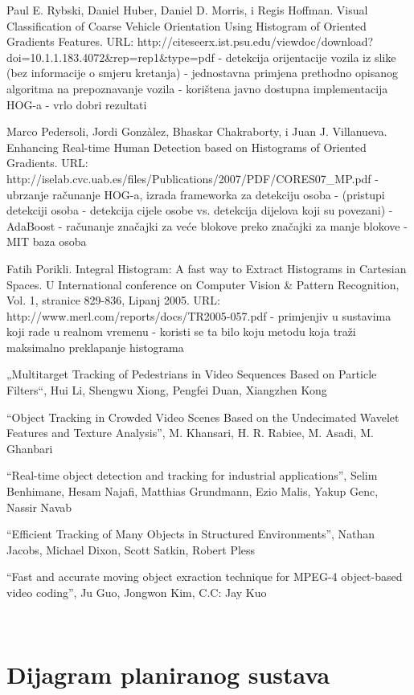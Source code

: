 \documentclass[times, utf8, seminar, numeric]{fer}
\begin{document}
Paul E. Rybski, Daniel Huber, Daniel D. Morris, i Regis Hoffman. Visual Classiﬁcation of Coarse Vehicle Orientation Using Histogram of Oriented Gradients Features. URL: http://citeseerx.ist.psu.edu/viewdoc/download?doi=10.1.1.183.4072&rep=rep1&type=pdf
- detekcija orijentacije vozila iz slike (bez informacije o smjeru kretanja)
- jednostavna primjena prethodno opisanog algoritma na prepoznavanje vozila
- korištena javno dostupna implementacija HOG-a
- vrlo dobri rezultati


Marco Pedersoli, Jordi Gonzàlez, Bhaskar Chakraborty, i Juan J. Villanueva. Enhancing Real-time Human Detection based on Histograms of Oriented Gradients. URL: http://iselab.cvc.uab.es/files/Publications/2007/PDF/CORES07_MP.pdf
- ubrzanje računanje HOG-a, izrada frameworka za detekciju osoba
- (pristupi detekciji osoba - detekcija cijele osobe vs. detekcija dijelova koji su povezani)
- AdaBoost
- računanje značajki za veće blokove preko značajki za manje blokove
- MIT baza osoba


Fatih Porikli. Integral Histogram: A fast way to Extract Histograms in Cartesian Spaces. U International conference on Computer Vision & Pattern Recognition, Vol. 1, stranice 829-836, Lipanj 2005. URL: http://www.merl.com/reports/docs/TR2005-057.pdf
- primjenjiv u sustavima koji rade u realnom vremenu
- koristi se ta bilo koju metodu koja traži maksimalno preklapanje histograma


„Multitarget Tracking of Pedestrians in Video Sequences Based on Particle Filters“, Hui Li, Shengwu Xiong, Pengfei Duan, Xiangzhen Kong

“Object Tracking in Crowded Video Scenes Based on the Undecimated Wavelet Features and Texture Analysis”, M. Khansari, H. R. Rabiee, M. Asadi, M. Ghanbari

“Real-time object detection and tracking for industrial applications”, Selim Benhimane, Hesam Najafi, Matthias Grundmann, Ezio Malis, Yakup Genc, Nassir Navab

“Efficient Tracking of Many Objects in Structured Environments”, Nathan Jacobs, Michael Dixon, Scott Satkin, Robert Pless

“Fast and accurate moving object exraction technique for MPEG-4 object-based video coding”, Ju Guo, Jongwon Kim, C.C: Jay Kuo

﻿

\chapter{Dijagram planiranog sustava}
\end{document}
